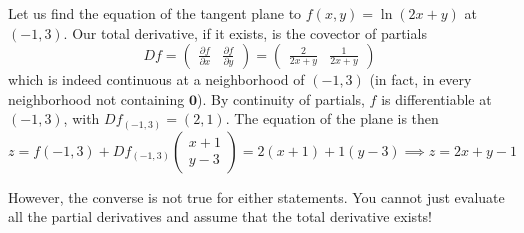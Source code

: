   \begin{example}
    Let us find the equation of the tangent plane to $f(x, y) = \ln(2x + y)$ at $(-1, 3)$. Our total derivative, if it exists, is the covector of partials
    \[D f = \begin{pmatrix} \frac{\partial f}{\partial x} & \frac{\partial f}{\partial y} \end{pmatrix} = \begin{pmatrix} \frac{2}{2x + y} & \frac{1}{2x + y} \end{pmatrix}\]
    which is indeed continuous at a neighborhood of $(-1, 3)$ (in fact, in every neighborhood not containing $\mathbf{0}$). By continuity of partials, $f$ is differentiable at $(-1, 3)$, with $D f_{(-1, 3)} = (2, 1)$. The equation of the plane is then 
    \[z = f(-1, 3) + D f_{(-1, 3)} \begin{pmatrix} x + 1\\ y - 3 \end{pmatrix} = 2(x + 1) + 1 (y - 3) \implies z = 2x + y - 1\]
  \end{example}

  However, the converse is not true for either statements. You cannot just evaluate all the partial derivatives and assume that the total derivative exists! 

